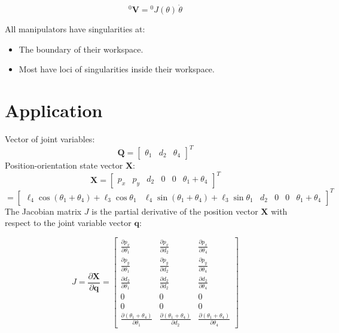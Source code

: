 \[
{}^0\mathbf{V} = {}^0\!J(\theta) \, \dot{\theta}
\]

All manipulators have singularities at:
\begin{itemize}
    \item The boundary of their workspace.
    \item Most have loci of singularities inside their workspace.
\end{itemize}
\section{Application}
Vector of joint variables:
\[
\mathbf{Q} = \begin{bmatrix} \theta_1 & d_2 & \theta_4 \end{bmatrix}^T
\]
Position-orientation state vector $\mathbf{X}$:
\[
\mathbf{X} = \begin{bmatrix} p_x & p_y & d_2 & 0 & 0 & \theta_1 + \theta_4 \end{bmatrix}^T
\]
\[
= \begin{bmatrix} 
\ell_4 \cos(\theta_1 + \theta_4) + \ell_3 \cos \theta_1 & 
\ell_4 \sin(\theta_1 + \theta_4) + \ell_3 \sin \theta_1 & 
d_2 & 
0 & 
0 & 
\theta_1 + \theta_4 
\end{bmatrix}^T
\]
The Jacobian matrix $J$ is the partial derivative of the position vector $\mathbf{X}$ with respect to the joint variable vector $\mathbf{q}$:

\[
J = \frac{\partial \mathbf{X}}{\partial \mathbf{q}} =
\begin{bmatrix}
\frac{\partial p_x}{\partial \theta_1} & \frac{\partial p_x}{\partial d_2} & \frac{\partial p_x}{\partial \theta_4} \\
\frac{\partial p_y}{\partial \theta_1} & \frac{\partial p_y}{\partial d_2} & \frac{\partial p_y}{\partial \theta_4} \\
\frac{\partial d_2}{\partial \theta_1} & \frac{\partial d_2}{\partial d_2} & \frac{\partial d_2}{\partial \theta_4} \\
0 & 0 & 0 \\
0 & 0 & 0 \\
\frac{\partial (\theta_1 + \theta_4)}{\partial \theta_1} & \frac{\partial (\theta_1 + \theta_4)}{\partial d_2} & \frac{\partial (\theta_1 + \theta_4)}{\partial \theta_4}
\end{bmatrix}
\]

